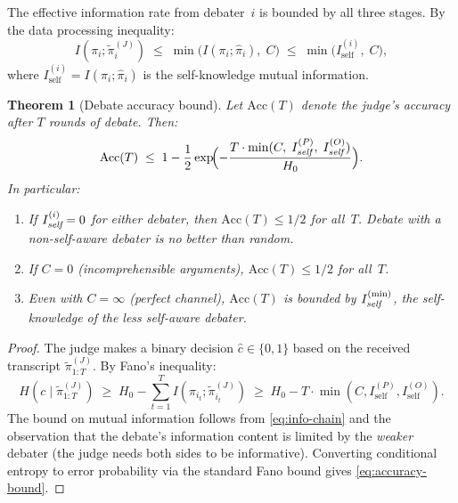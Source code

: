 \documentclass[11pt,a4paper]{article}
\newtheorem{theorem}{Theorem}[section]
\begin{document}
The effective information rate from debater~$i$ is bounded by all three
stages. By the data processing inequality:
\begin{equation}\label{eq:info-chain}
    I(\pi_i; \tilde{\pi}_i^{(J)})
    \;\leq\; \min\bigl(I(\pi_i; \hat{\pi}_i),\; C\bigr)
    \;\leq\; \min\bigl(I_{\text{self}}^{(i)},\; C\bigr),
\end{equation}
where $I_{\text{self}}^{(i)} = I(\pi_i; \hat{\pi}_i)$ is the
self-knowledge mutual information.

\begin{theorem}[Debate accuracy bound]
\label{thm:accuracy-bound}
Let $\text{Acc}(T)$ denote the judge's accuracy after $T$ rounds
of debate. Then:
\begin{equation}\label{eq:accuracy-bound}
    \text{Acc}(T) \;\leq\;
    1 - \frac{1}{2}\exp\!\Bigl(
        -\frac{T \cdot \min(C,\; I_{\emph{self}}^{(P)},\; I_{\emph{self}}^{(O)})}{H_0}
    \Bigr).
\end{equation}
In particular:
\begin{enumerate}[\rm(a)]
    \item If $I_{\emph{self}}^{(i)} = 0$ for either debater, then
    $\text{Acc}(T) \leq 1/2$ for all~$T$. Debate with a non-self-aware
    debater is no better than random.
    \item If $C = 0$ (incomprehensible arguments), $\text{Acc}(T) \leq 1/2$
    for all~$T$.
    \item Even with $C = \infty$ (perfect channel), $\text{Acc}(T)$ is
    bounded by $I_{\emph{self}}^{(\min)}$, the self-knowledge of the
    less self-aware debater.
\end{enumerate}
\end{theorem}

\begin{proof}
The judge makes a binary decision $\hat{c} \in \{0, 1\}$ based on the
received transcript $\tilde{\pi}^{(J)}_{1:T}$. By Fano's inequality:
\begin{equation}
    H(c \mid \tilde{\pi}^{(J)}_{1:T})
    \;\geq\; H_0 - \sum_{t=1}^{T} I(\pi_{i_t}; \tilde{\pi}_{i_t}^{(J)})
    \;\geq\; H_0 - T \cdot \min(C, I_{\text{self}}^{(P)}, I_{\text{self}}^{(O)}).
\end{equation}
The bound on mutual information follows from \eqref{eq:info-chain} and
the observation that the debate's information content is limited by the
\emph{weaker} debater (the judge needs both sides to be informative).
Converting conditional entropy to error probability via the standard
Fano bound gives \eqref{eq:accuracy-bound}.
\end{proof}
\end{document}
